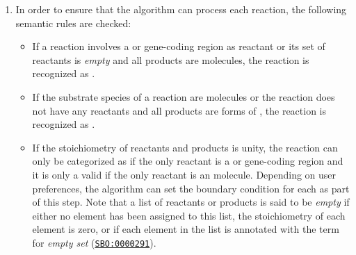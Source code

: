 \begin{enumerate}
  \item In order to ensure that the algorithm can process each reaction, the following semantic rules are checked:
  \begin{itemize}
    \item If a reaction involves a \gene or gene-coding region as reactant or its set of reactants is \emph{empty} and all products are \RNA molecules, the reaction is recognized as \transcription.
    \item If the substrate species of a reaction are \RNA molecules or the reaction does not have any reactants and all products are forms of \protein, the reaction is recognized as \translation.
    \item If the stoichiometry of reactants and products is unity, the reaction can only be categorized as \transcription if the only reactant is a \gene or gene-coding region and it is only a valid \translation if the only reactant is an \RNA molecule.
Depending on user preferences, the algorithm can set the boundary condition for each \gene as part of this step.
Note that a list of reactants or products is said to be \emph{empty} if either no element has been assigned to this list, the stoichiometry of each element is zero, or if each element in the list is annotated with the \SBO term for \emph{empty set} (\href{http://identifiers.org/biomodels.sbo/SBO:0000291}{\texttt{SBO:0000291}}).
  \end{itemize}
\end{enumerate}

